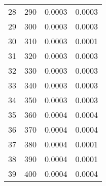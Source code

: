 \begin{table}
\begin{adjustbox}{width=1\textwidth/2}
\begin{tabular}{|c|c|c|c|}
\cline{1-4}
28 & 290 & 0.0003 & 0.0003 \\
\cline{1-4}
29 & 300 & 0.0003 & 0.0003 \\
\cline{1-4}
30 & 310 & 0.0003 & 0.0001 \\
\cline{1-4}
31 & 320 & 0.0003 & 0.0003 \\
\cline{1-4}
32 & 330 & 0.0003 & 0.0003 \\
\cline{1-4}
33 & 340 & 0.0003 & 0.0003 \\
\cline{1-4}
34 & 350 & 0.0003 & 0.0003 \\
\cline{1-4}
35 & 360 & 0.0004 & 0.0004 \\
\cline{1-4}
36 & 370 & 0.0004 & 0.0004 \\
\cline{1-4}
37 & 380 & 0.0004 & 0.0001 \\
\cline{1-4}
38 & 390 & 0.0004 & 0.0001 \\
\cline{1-4}
39 & 400 & 0.0004 & 0.0004 \\
\cline{1-4}
\end{tabular}
\end{adjustbox}
\end{table}


